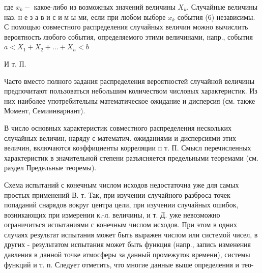 \documentclass[10pt]{article}
\begin{document}
где $x_{k}-$ какое-либо из возможных значений величины $X_{k}$. Случайные величины наз. н е з а в и с и м ы ми, если при любом выборе $x_{k}$ события (6) независимы. С помощью совместного распределения случайных величин можно вычислить вероятность любого события, определяемого этими величинами, напр., события $a<X_{1}+X_{2}+\ldots+X_{n}<b$



И т. П.



Часто вместо полного задания распределения вероятностей случайной величины предпочитают пользоваться небольшим количеством числовых характеристик. Из них наиболее употребительны математическое ожидание и дисперсия (см. также Момент, Семиинвариант).



В число основных характеристик совместного распределения нескольких случайных величин, наряду с математич. ожиданиями и дисперсиями этих величин, включаются коэффициенты корреляции п т. П. Смысл перечисленных характеристик в значительной степени разъясняется предельными теоремами (см. раздел Предельные теоремы).



Схема испытаний с конечным числом исходов недостаточна уже для самых простых применений В. т. Так, при изучении случайного разброса точек попаданий снарядов вокруг центра цели, при изучении случайных ошибок, возникающих при измерении к.-л. величины, и т. Д. уже невозможно ограничиться испытаниями с конечным числом исходов. При этом в одних случаях результат испытания может быть выражен числом или системой чисел, в других - результатом испытания может быть функция (напр., запись изменения давления в данной точке атмосферы за данный промежуток времени), системы функций и т. п. Следует отметить, что многие данные выше определения и тео-
\end{document}
